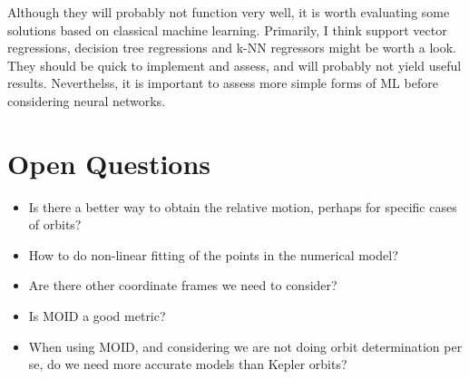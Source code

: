\documentclass[a4paper,10pt]{article}
\begin{document}
Although they will probably not function very well, it is worth evaluating some solutions based on classical machine learning. Primarily, I think support vector regressions, decision tree regressions and k-NN regressors might be worth a look. They should be quick to implement and assess, and will probably not yield useful results. Neverthelss, it is important to assess more simple forms of ML before considering neural networks.

\section{Open Questions}
\begin{itemize}
 \item Is there a better way to obtain the relative motion, perhaps for specific cases of orbits?
 \item How to do non-linear fitting of the points in the numerical model?
 \item Are there other coordinate frames we need to consider?
 \item Is MOID a good metric?
 \item When using MOID, and considering we are not doing orbit determination per se, do we need more accurate models than Kepler orbits?
\end{itemize}
\end{document}

